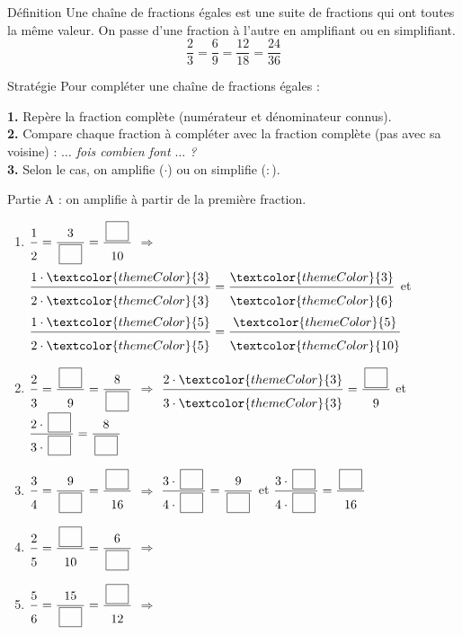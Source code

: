 \begin{regle}{Définition}
Une \textcolor{themeColor}{chaîne de fractions égales} est une suite de fractions qui ont toutes la même valeur. On passe d'une fraction à l'autre en amplifiant ou en simplifiant.
\[\dfrac{2}{3}=\dfrac{6}{9}=\dfrac{12}{18}=\dfrac{24}{36}\]
\end{regle}

\vspace{15pt}
\begin{astuce}{Stratégie}
Pour compléter une chaîne de fractions égales :

\vspace{5pt}
\textbf{1.} Repère la fraction complète (numérateur et dénominateur connus).\\
\textbf{2.} Compare chaque fraction à compléter avec la fraction complète (pas avec sa voisine) : \textit{\og $\ldots$ fois combien font $\ldots$ ?\fg{}}\\
\textbf{3.} Selon le cas, on amplifie ($\cdot$) ou on simplifie ($:$).
\end{astuce}


\newpage


\vspace{20pt}
\textcolor{themeColor}{Partie A} : on amplifie à partir de la première fraction.

\begin{enumerate}[leftmargin=*,align=parleft, label=\alph*), itemsep=6pt]
\item $\FA{1}{2}=\FA{3}{\CaseC}=\FA{\CaseC}{10}$ \quad $\Longrightarrow$ \quad $\FA{1 \cdot \textcolor{themeColor}{3}}{2 \cdot \textcolor{themeColor}{3}}=\FA{\textcolor{themeColor}{3}}{\textcolor{themeColor}{6}}$ \quad et \quad $\FA{1 \cdot \textcolor{themeColor}{5}}{2 \cdot \textcolor{themeColor}{5}}=\FA{\textcolor{themeColor}{5}}{\textcolor{themeColor}{10}}$
\item $\FA{2}{3}=\FA{\CaseC}{9}=\FA{8}{\CaseC}$ \quad $\Longrightarrow$ \quad $\FA{2 \cdot \textcolor{themeColor}{3}}{3 \cdot \textcolor{themeColor}{3}}=\FA{\CaseC}{9}$ \quad et \quad $\FA{2 \cdot \CaseC}{3 \cdot \CaseC}=\FA{8}{\CaseC}$
\item $\FA{3}{4}=\FA{9}{\CaseC}=\FA{\CaseC}{16}$ \quad $\Longrightarrow$ \quad $\FA{3 \cdot \CaseC}{4 \cdot \CaseC}=\FA{9}{\CaseC}$ \quad et \quad $\FA{3 \cdot \CaseC}{4 \cdot \CaseC}=\FA{\CaseC}{16}$
\item $\FA{2}{5}=\FA{\CaseC}{10}=\FA{6}{\CaseC}$ \quad $\Longrightarrow$
\item $\FA{5}{6}=\FA{15}{\CaseC}=\FA{\CaseC}{12}$ \quad $\Longrightarrow$
\end{enumerate}

